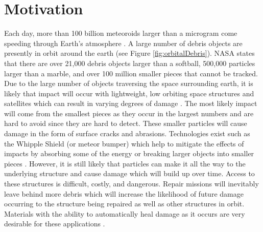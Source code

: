 \section{Motivation}

Each day, more than 100 billion meteoroids larger than a microgram come speeding through Earth's atmosphere \cite{Close2010}. A large number of debris objects are presently in orbit around the earth (see Figure \ref{fig:orbitalDebris}). NASA states that there are over 21,000 debris objects larger than a softball, 500,000 particles larger than a marble, and over 100 million smaller pieces that cannot be tracked. Due to the large number of objects traversing the space surrounding earth, it is likely that impact will occur with lightweight, low orbiting space structures and satellites which can result in varying degrees of damage \cite{NASAOD2012}. The most likely impact will come from the smallest pieces as they occur in the largest numbers and are hard to avoid since they are hard to detect. These smaller particles will cause damage in the form of surface cracks and abrasions. Technologies exist such as the Whipple Shield (or meteor bumper) which help to mitigate the effects of impacts by absorbing some of the energy or breaking larger objects into smaller pieces \cite{NASAHVIT2012}. However, it is still likely that particles can make it all the way to the underlying structure and cause damage which will build up over time. Access to these structures is difficult, costly, and dangerous. Repair missions will inevitably leave behind more debris which will increase the likelihood of future damage occurring to the structure being repaired as well as other structures in orbit. Materials with the ability to automatically heal damage as it occurs are very desirable for these applications \cite{Lee2009}.

